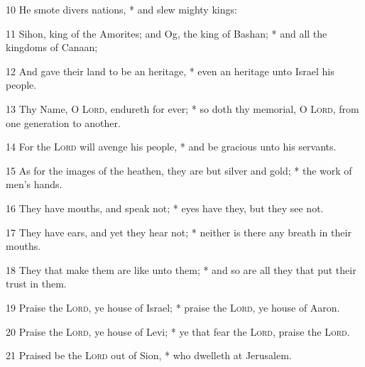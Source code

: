 10 He smote divers nations, * and slew mighty kings:\par
11 Sihon, king of the Amorites; and Og, the king of Bashan; * and all the kingdoms of Canaan;\par
12 And gave their land to be an heritage, * even an heritage unto Israel his people.\par
13 Thy Name, O {\textsc{Lord}}, endureth for ever; * so doth thy memorial, O {\textsc{Lord}}, from one generation to another.\par
14 For the {\textsc{Lord}} will avenge his people, * and be gracious unto his servants.\par
15 As for the images of the heathen, they are but silver and gold; * the work of men's hands.\par
16 They have mouths, and speak not; * eyes have they, but they see not.\par
17 They have ears, and yet they hear not; * neither is there any breath in their mouths.\par
18 They that make them are like unto them; * and so are all they that put their trust in them.\par
19 Praise the {\textsc{Lord}}, ye house of Israel; * praise the {\textsc{Lord}}, ye house of Aaron.\par
20 Praise the {\textsc{Lord}}, ye house of Levi; * ye that fear the {\textsc{Lord}}, praise the {\textsc{Lord}}.\par
21 Praised be the {\textsc{Lord}} out of Sion, * who dwelleth at Jerusalem.
